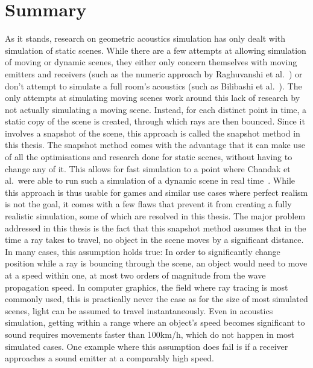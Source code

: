 \chapter{Summary}\label{ch:Summary}

As it stands, research on geometric acoustics simulation has only dealt with simulation of static scenes.
While there are a few attempts at allowing simulation of moving or dynamic scenes,
they either only concern themselves with moving emitters and receivers
(such as the numeric approach by Raghuvanshi et al.~\cite{RS10})
or don't attempt to simulate a full room's acoustics (such as Bilibashi et al.~\cite{BVD20}).
\newline
The only attempts at simulating moving scenes work around this lack of research by not actually simulating a moving scene.
Instead, for each distinct point in time, a static copy of the scene is created,
through which rays are then bounced.
Since it involves a snapshot of the scene, this approach is called the snapshot method in this thesis.
\newline
The snapshot method comes with the advantage that it can make use of all the optimisations and research done for static scenes,
without having to change any of it.
This allows for fast simulation to a point where Chandak et al.~were able to run such a simulation of a dynamic scene in real time~\cite{Cha08}.
While this approach is thus usable for games and similar use cases where perfect realism is not the goal,
it comes with a few flaws that prevent it from creating a fully realistic simulation,
some of which are resolved in this thesis.
\newline
The major problem addressed in this thesis is the fact that this snapshot method assumes that in the time a ray takes to travel,
no object in the scene moves by a significant distance.
In many cases, this assumption holds true:
In order to significantly change position while a ray is bouncing through the scene,
an object would need to move at a speed within one, at most two orders of magnitude from the wave propagation speed.
In computer graphics, the field where ray tracing is most commonly used,
this is practically never the case as for the size of most simulated scenes,
light can be assumed to travel instantaneously.
Even in acoustics simulation, getting within a range where an object's speed becomes significant to sound
requires movements faster than 100km/h, which do not happen in most simulated cases.
\newline
One example where this assumption does fail is if a receiver approaches a sound emitter at a comparably high speed.
